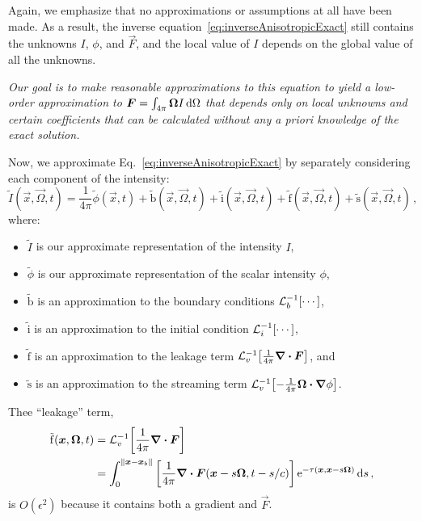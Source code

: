 Again, we emphasize that no approximations or assumptions at all have been
made. As a
result, the inverse equation~\eqref{eq:inverseAnisotropicExact} still contains
the unknowns $I$, $\phi$, and $\vec{F}$, and the local value of
$I$ depends on the global value of all the unknowns.

\emph{
Our goal is to make reasonable approximations to this equation to yield a
low-order approximation to $\bm{F}=\int_{4\pi}\bm{\Omega} I \mathop{}\!\mathrm{d} \Omega$ that
depends only on local unknowns and certain coefficients that can be calculated
without any \emph{a priori} knowledge of the exact solution.
}

Now, we approximate Eq.~\eqref{eq:inverseAnisotropicExact} by
separately considering each component of the intensity:
\begin{equation}\label{eq:approxIntensity1}
  \tilde I(\vec{x}, \vec{\Omega}, t)
  = \frac1{4\pi} \tilde \phi(\vec{x}, t) 
  + \mathrm{ \tilde b }(\vec{x}, \vec{\Omega}, t)
  + \mathrm{ \tilde i }(\vec{x}, \vec{\Omega}, t)
  + \mathrm{ \tilde f }(\vec{x}, \vec{\Omega}, t)
  + \mathrm{ \tilde s }(\vec{x}, \vec{\Omega}, t) \,,
\end{equation}
where:
\prelistpar\begin{itemize}
  \item $\tilde I$ is our approximate representation of the intensity $I$,
  \item $\tilde \phi$ is our approximate representation of the scalar intensity
    $\phi$,
  \item $\mathrm{ \tilde b }$ is an approximation to the boundary conditions
    $\mathcal{L}_{b}^{-1}\!\left[\cdots\right]$,
  \item $\mathrm{ \tilde i }$ is an approximation to the initial condition 
    $\mathcal{L}_{i}^{-1}\!\left[\cdots\right]$,
  \item $\mathrm{ \tilde f }$ is an approximation to the leakage term
    $\mathcal{L}_{v}^{-1}\!\left[ \frac1{4\pi} \bm{\nabla} \bm{\cdot} \bm{F} \right]$, and
  \item $\mathrm{ \tilde s }$ is an approximation to the streaming term
    $\mathcal{L}_{v}^{-1}\!\left[ -\frac1{4\pi} \bm{\Omega}\bm{\cdot} \bm{\nabla} \phi \right]$.
\end{itemize}

Thee ``leakage'' term,
\begin{align*}
  \mathrm{ \tilde f }(\bm{x}, \bm{\Omega}, t) &=
   \mathcal{L}_{v}^{-1}\!\left[ \frac1{4\pi}\bm{\nabla} \bm{\cdot} \bm{F} \right]
  \\
  &= \int_{0}^{\left\| \bm{x} - \bm{x}_b \right\|}
    \left[ \frac1{4\pi}\bm{\nabla} \bm{\cdot} \bm{F}(\bm{x} - s \bm{\Omega}, t-s/c)
    \right]
    \mathop{}\!\mathrm{e}^{ -\tau(\bm{x}, \bm{x} - s \bm{\Omega})}
    \mathop{}\!\mathrm{d} s \,,
\end{align*}
is $O(\epsilon^2)$ because it contains both a gradient and $\vec{F}$.

